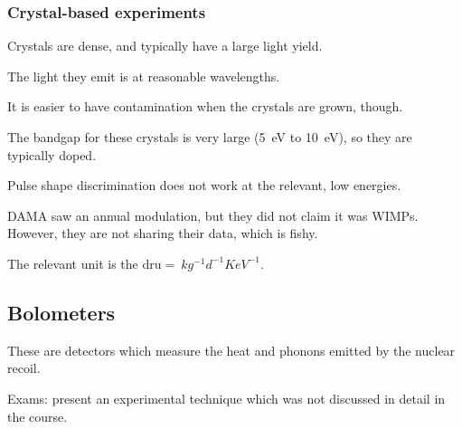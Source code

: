 \documentclass[main.tex]{subfiles}
\begin{document}
\subsubsection{Crystal-based experiments}



Crystals are dense, and typically have a large light yield. 

The light they emit is at reasonable wavelengths. 

It is easier to have contamination when the crystals are grown, though. 

The bandgap for these crystals is very large (\SI{5}{eV} to \SI{10}{eV}), 
so they are typically doped. 

Pulse shape discrimination does not work at the relevant, low energies. 

DAMA saw an annual modulation, but they did not claim it was WIMPs. 
However, they are not sharing their data, which is fishy. 

The relevant unit is the \(\text{dru} = \SI{}{kg^{-1} d^{-1} KeV^{-1}}\). 

\subsection{Bolometers}

These are detectors which measure the heat and phonons emitted by the nuclear recoil. 

Exams: present an experimental technique which was not discussed in detail in the course. 
\end{document}
